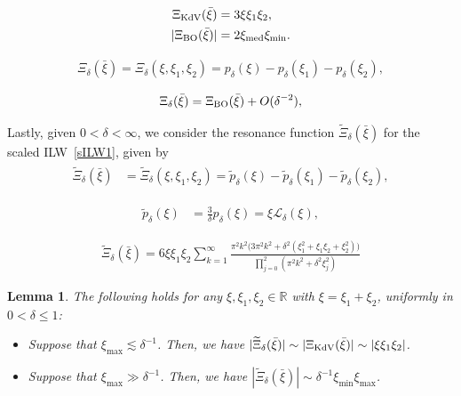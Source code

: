 \documentclass[10pt,a4paper]{amsart}
\newtheorem{lemma}{Lemma}
\newcommand{\BO}{\text{\rm BO} }
\newcommand{\KDV}{\text{\rm KdV} }
\renewcommand{\L}{\mathcal{L}}
\newcommand{\R}{\mathbb{R}}
\newcommand{\dl}{\delta}
\newcommand{\ges}{\gtrsim}
\newcommand{\les}{\lesssim}
\DeclareMathOperator{\med}{med}
\newcommand{\noi}{\noindent}
\newcommand{\wt}{\widetilde}
\begin{document}
\begin{align}
\Xi_\KDV (\bar \xi) &= 3\xi \xi_1 \xi_2,\label{res1}\\
|\Xi_{\BO}(\bar \xi)| &= 2\xi_{\med}\xi_{\min}\label{res3}.
\end{align}

\begin{align}
\Xi_\dl (\bar \xi)
= \Xi_\dl(\xi,\xi_1,\xi_2) =  p_\dl(\xi)  -   p_\dl(\xi_1) -  p_\dl(\xi_2), 
\label{res4}
\end{align}

\begin{align}
\Xi_\dl(\bar \xi) =  \Xi_\BO(\bar \xi) + O(\dl^{-2}), 
\label{res8}
\end{align}

Lastly, given $0 < \dl < \infty$, we consider the resonance function 
$\wt \Xi_\dl (\bar \xi)$  for the scaled ILW~\eqref{sILW1}, given by 
\begin{align}
\begin{split}
\wt \Xi_\dl (\bar \xi)
& = \wt \Xi_\dl(\xi,\xi_1,\xi_2) 
=  \wt p_\dl(\xi)  -  \wt  p_\dl(\xi_1) -  \wt p_\dl(\xi_2), 
\end{split}
\label{res9}
\end{align}

 \begin{align}
\wt p_\dl(\xi)
&  =   \frac 3 \dl p_\dl(\xi) 
= \xi \L_\dl(\xi),  %
\label{res10}
\end{align}

\begin{align}
\wt \Xi_\dl(\bar \xi)
= 6\xi \xi_1 \xi_2
 \sum_{k=1}^{\infty}   
 \frac{ \pi^2 k^2 \big(3 \pi^2 k^2 + \dl^2(\xi_1^2 + \xi_1 \xi_2 + \xi_2^2)\big)}
 {\prod_{j = 0}^2(\pi^2 k^2 +\dl^2\xi_j^2)}
\label{LL1}
\end{align}

\begin{lemma}\label{LEM:res}
The following holds 
for any $\xi, \xi_1, \xi_2 \in \R$
with $\xi = \xi_1 + \xi_2$, 
uniformly in $0 < \dl \le 1$\textup{:}

\smallskip

\begin{itemize}
\item
[\textup{(i)}]
Suppose that  $\xi_{\max} \les \dl^{-1}$.
Then, we have 
$|\wt \Xi_\dl(\bar \xi)|
\sim |\Xi_\KDV(\bar \xi)|\sim |\xi\xi_1\xi_2|$.




\medskip

\item [\textup{(ii)}]
Suppose that $ \xi_{\max} \gg \dl^{-1}$.
Then, we have 
$|\wt \Xi_\dl(\bar \xi)|
\sim    \dl^{-1} \xi_{\min}\xi_{\max}$. 


%


\end{itemize}



\end{lemma}
\end{document}
